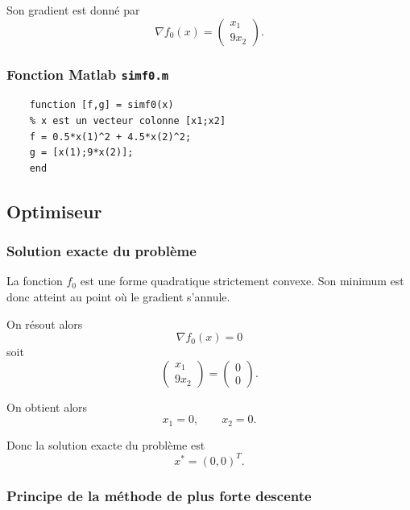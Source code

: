 \documentclass[a4paper,12pt]{article}
\begin{document}
	Son gradient est donné par
	\begin{equation}
	\nabla f_0(x)=
	\begin{pmatrix}
	x_1\\
	9x_2
	\end{pmatrix}.
	\end{equation}
	
	\subsubsection{Fonction Matlab \texttt{simf0.m}}
	
	\begin{verbatim}
	function [f,g] = simf0(x)
	% x est un vecteur colonne [x1;x2]
	f = 0.5*x(1)^2 + 4.5*x(2)^2;
	g = [x(1);9*x(2)];
	end
	\end{verbatim}
	
	\subsection{Optimiseur}
	
	\subsubsection{Solution exacte du problème}
	
	La fonction $f_0$ est une forme quadratique strictement convexe. Son minimum est donc atteint au point où le gradient s'annule.
	
	On résout alors
	\begin{equation}
	\nabla f_0(x)=0
	\end{equation}
	soit
	\begin{equation}
	\begin{pmatrix}
	x_1\\
	9x_2
	\end{pmatrix}
	=
	\begin{pmatrix}
	0\\
	0
	\end{pmatrix}.
	\end{equation}
	
	On obtient alors
	\begin{equation}
	x_1=0, \qquad x_2=0.
	\end{equation}
	
	Donc la solution exacte du problème est
	\begin{equation}
	x^*=(0,0)^T.
	\end{equation}
	
	\subsubsection{Principe de la méthode de plus forte descente}
	
\end{document}
